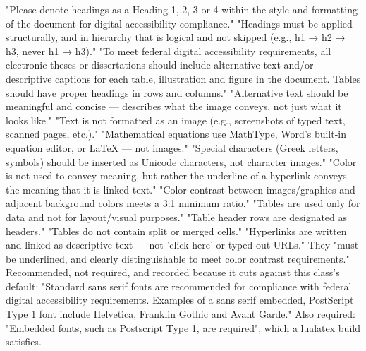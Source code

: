 	{"Please denote headings as a Heading 1, 2, 3 or 4 within the style and
	 formatting of the document for digital accessibility compliance."
	 "Headings must be applied structurally, and in hierarchy that is logical
	 and not skipped (e.g., h1 → h2 → h3, never h1 → h3)."}
	{"To meet federal digital accessibility requirements, all electronic theses
	 or dissertations should include alternative text and/or descriptive
	 captions for each table, illustration and figure in the document. Tables
	 should have proper headings in rows and columns." "Alternative text should
	 be meaningful and concise — describes what the image conveys, not just what
	 it looks like."}
	{"Text is not formatted as an image (e.g., screenshots of typed text,
	 scanned pages, etc.)." "Mathematical equations use MathType, Word's
	 built-in equation editor, or LaTeX — not images." "Special characters (Greek
	 letters, symbols) should be inserted as Unicode characters, not character
	 images."}
	{"Color is not used to convey meaning, but rather the underline of a
	 hyperlink conveys the meaning that it is linked text." "Color contrast
	 between images/graphics and adjacent background colors meets a 3:1 minimum
	 ratio."}
	{"Tables are used only for data and not for layout/visual purposes." "Table
	 header rows are designated as headers." "Tables do not contain split or
	 merged cells."}
	{"Hyperlinks are written and linked as descriptive text — not 'click here'
	 or typed out URLs." They "must be underlined, and clearly distinguishable
	 to meet color contrast requirements."}
	{Recommended, not required, and recorded because it cuts against this
	 class's default: "Standard sans serif fonts are recommended for compliance
	 with federal digital accessibility requirements. Examples of a sans serif
	 embedded, PostScript Type 1 font include Helvetica, Franklin Gothic and
	 Avant Garde." Also required: "Embedded fonts, such as Postscript Type 1,
	 are required", which a lualatex build satisfies.}

